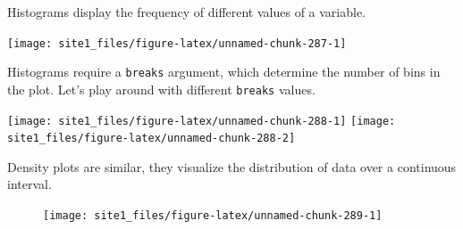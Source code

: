 \documentclass[]{book}
\newenvironment{Shaded}{\begin{snugshade}}{\end{snugshade}}
\newcommand{\KeywordTok}[1]{\textcolor[rgb]{0.13,0.29,0.53}{\textbf{#1}}}
\newcommand{\DataTypeTok}[1]{\textcolor[rgb]{0.13,0.29,0.53}{#1}}
\newcommand{\DecValTok}[1]{\textcolor[rgb]{0.00,0.00,0.81}{#1}}
\newcommand{\StringTok}[1]{\textcolor[rgb]{0.31,0.60,0.02}{#1}}
\newcommand{\CommentTok}[1]{\textcolor[rgb]{0.56,0.35,0.01}{\textit{#1}}}
\newcommand{\OperatorTok}[1]{\textcolor[rgb]{0.81,0.36,0.00}{\textbf{#1}}}
\newcommand{\AlertTok}[1]{\textcolor[rgb]{0.94,0.16,0.16}{#1}}
\newcommand{\NormalTok}[1]{#1}
\begin{document}
Histograms display the frequency of different values of a variable.

\begin{Shaded}
\end{Shaded}

\begin{center}\texttt{[image: site1\_files/figure-latex/unnamed-chunk-287-1]} \end{center}

Histograms require a \texttt{breaks} argument, which determine the
number of bins in the plot. Let's play around with different
\texttt{breaks} values.

\begin{Shaded}
\end{Shaded}

\begin{center}\texttt{[image: site1\_files/figure-latex/unnamed-chunk-288-1]} \texttt{[image: site1\_files/figure-latex/unnamed-chunk-288-2]} \end{center}

Density plots are similar, they visualize the distribution of data over
a continuous interval.

\begin{Shaded}
\end{Shaded}

\begin{figure}

{\centering \texttt{[image: site1\_files/figure-latex/unnamed-chunk-289-1]} 

}

\caption{ }\label{fig:unnamed-chunk-289}
\end{figure}
\end{document}
